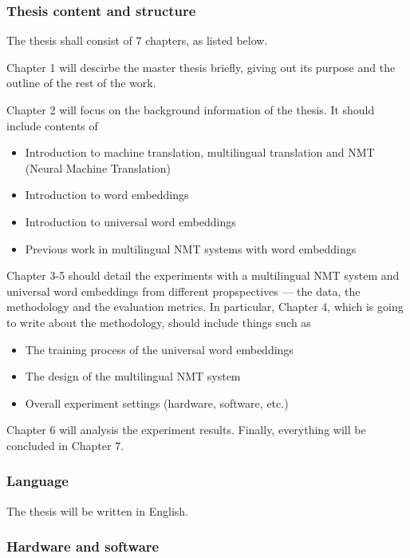 \documentclass[a4paper,12pt]{article}
\begin{document}
\subsubsection*{Thesis content and structure}

The thesis shall consist of 7 chapters, as listed below.

Chapter 1 will descirbe the master thesis briefly, giving out its purpose and the outline of the rest of the work.

Chapter 2 will focus on the background information of the thesis. It should include contents of 

\begin{itemize}
    \item Introduction to machine translation, multilingual translation and NMT (Neural Machine Translation)
    \item Introduction to word embeddings
    \item Introduction to universal word embeddings
    \item Previous work in multilingual NMT systems with word embeddings
\end{itemize}

Chapter 3-5 should detail the experiments with a multilingual NMT system and universal word embeddings from different propspectives --- the data, the methodology and the evaluation metrics. In particular, Chapter 4, which is going to write about the methodology, should include things such as

\begin{itemize}
    \item The training process of the universal word embeddings
    \item The design of the multilingual NMT system
    \item Overall experiment settings (hardware, software, etc.)
\end{itemize}

Chapter 6 will analysis the experiment results. Finally, everything will be concluded in Chapter 7.

\subsubsection*{Language}

The thesis will be written in English.

\subsubsection*{Hardware and software}
\end{document}
